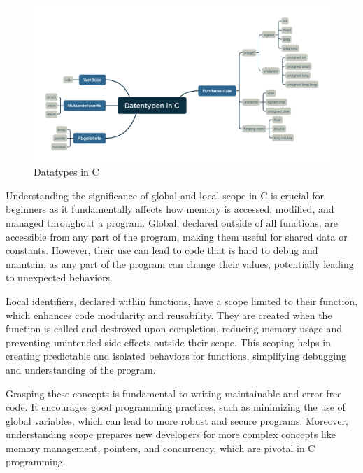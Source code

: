 \documentclass{dcbl/challenge}
\begin{document}
\begin{figure}
    \includegraphics[width=\textwidth]{DatentypeninC.png}
    \caption{Datatypes in C}
    \label{fig:DatentypeninC}
\end{figure}

Understanding the significance of global and local scope in C is crucial for beginners as it fundamentally affects how memory is accessed, modified, and managed throughout a program. 
Global, declared outside of all functions, are accessible from any part of the program, making them useful for shared data or constants. 
However, their use can lead to code that is hard to debug and maintain, as any part of the program can change their values, potentially leading to unexpected behaviors.

Local identifiers, declared within functions, have a scope limited to their function, which enhances code modularity and reusability. 
They are created when the function is called and destroyed upon completion, reducing memory usage and preventing unintended side-effects outside their scope. 
This scoping helps in creating predictable and isolated behaviors for functions, simplifying debugging and understanding of the program.

Grasping these concepts is fundamental to writing maintainable and error-free code. 
It encourages good programming practices, such as minimizing the use of global variables, which can lead to more robust and secure programs. 
Moreover, understanding scope prepares new developers for more complex concepts like memory management, pointers, and concurrency, which are pivotal in C programming.
\end{document}
